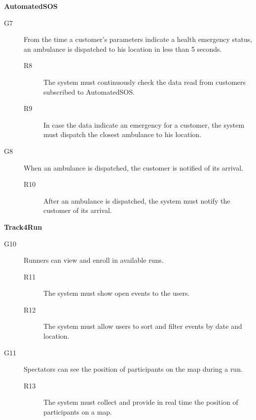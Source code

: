 \documentclass[../main.tex]{subfiles}
\begin{document}
\begin{minipage}{\textwidth}
{\bf AutomatedSOS}
\begin{description}
	\item [G7]  From the time a customer's parameters indicate a health emergency status, an ambulance is dispatched to his location in less than 5 seconds.
	\begin{description}
		\item [R8] The system must continuously check the data read from customers subscribed to AutomatedSOS.
		\item [R9] In case the data indicate an emergency for a customer, the system must dispatch the closest ambulance to his location.
	\end{description}

	\item [G8]  When an ambulance is dispatched, the customer is notified of its arrival.
	\begin{description}
		\item [R10] After an ambulance is dispatched, the system must notify the customer of its arrival.
	\end{description}
\end{description}
\end{minipage}
\vspace{8mm}


\begin{minipage}{\textwidth}
{\bf Track4Run}
\begin{description}

	\item [G10]  Runners can view and enroll in available runs.
	\begin{description}
		\item [R11] The system must show open events to the users.
		\item [R12] The system must allow users to sort and filter events by date and location.
	\end{description}

	\item [G11] Spectators can see the position of participants on the map during a run.
	\begin{description}
		\item [R13] The system must collect and provide in real time the position of participants on a map.
	\end{description}
\end{description}
\end{minipage}
\vspace{8mm}
\end{document}
